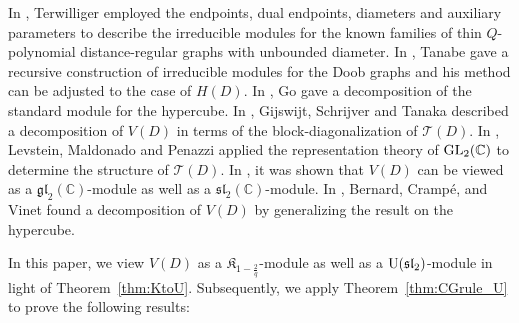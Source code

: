 \documentclass[10pt,a4paper]{amsart}
\def\C{\mathbb C}
\def\T{\mathcal T}
\def\U{{\rm U}(\mathfrak{sl}_2)}
\numberwithin{equation}{section}
\begin{document}
In \cite{TerAlgebraIII}, Terwilliger employed the endpoints, dual endpoints, diameters and auxiliary parameters to describe the irreducible modules for
the known families of thin $Q$-polynomial distance-regular graphs with unbounded diameter.
In \cite{Doob1997}, Tanabe gave a recursive construction of irreducible modules for the Doob graphs and his method can be adjusted to the case of $H(D)$. In \cite{hypercube2002}, Go gave a decomposition of the standard module for the hypercube. In \cite{semidefinite2006}, Gijswijt, Schrijver and Tanaka described a decomposition of $V(D)$ in terms of the block-diagonalization of $\T(D)$. In \cite{Hamming2006}, Levstein, Maldonado and Penazzi applied the representation theory of ${\rm GL}_2(\C)$ to determine the structure of $\T(D)$. In \cite{Manila}, it was shown that $V(D)$ can be viewed as a $\mathfrak{gl}_2(\C)$-module as well as a $\mathfrak{sl}_2(\C)$-module. In \cite{Hamming:2021}, Bernard, Cramp\'{e}, and Vinet found a decomposition of $V(D)$ by generalizing the result on the hypercube.

In this paper, we view $V(D)$ as a $\mathfrak{K}_{1-\frac{2}{q}}$-module as well as a $\U$-module in light of Theorem~\ref{thm:KtoU}. Subsequently, we apply Theorem~\ref{thm:CGrule_U} to prove the following results:
\end{document}
